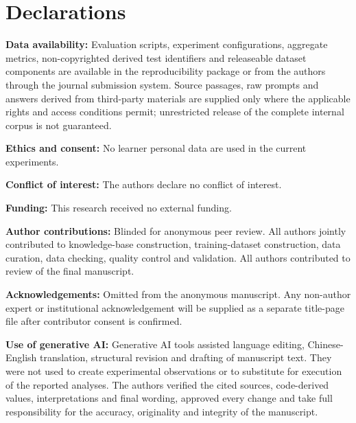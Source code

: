 \section{Declarations}

\textbf{Data availability:} Evaluation scripts, experiment configurations, aggregate metrics, non-copyrighted derived test identifiers and releaseable dataset components are available in the reproducibility package or from the authors through the journal submission system. Source passages, raw prompts and answers derived from third-party materials are supplied only where the applicable rights and access conditions permit; unrestricted release of the complete internal corpus is not guaranteed.

\textbf{Ethics and consent:} No learner personal data are used in the current experiments.

\textbf{Conflict of interest:} The authors declare no conflict of interest.

\textbf{Funding:} This research received no external funding.

\textbf{Author contributions:} Blinded for anonymous peer review. All authors jointly contributed to knowledge-base construction, training-dataset construction, data curation, data checking, quality control and validation. All authors contributed to review of the final manuscript.

\textbf{Acknowledgements:} Omitted from the anonymous manuscript. Any non-author expert or institutional acknowledgement will be supplied as a separate title-page file after contributor consent is confirmed.

\textbf{Use of generative AI:} Generative AI tools assisted language editing, Chinese-English translation, structural revision and drafting of manuscript text. They were not used to create experimental observations or to substitute for execution of the reported analyses. The authors verified the cited sources, code-derived values, interpretations and final wording, approved every change and take full responsibility for the accuracy, originality and integrity of the manuscript.
